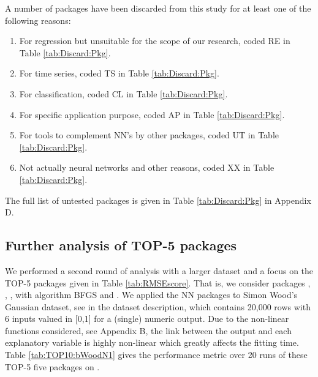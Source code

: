A number of packages have been discarded from this study for at least
one of the following reasons:

\begin{enumerate}
\def\labelenumi{\arabic{enumi}.}
\tightlist
\item
  For regression but unsuitable for the scope of our research, coded RE
  in Table \ref{tab:Discard:Pkg}.
\item
  For time series, coded TS in Table \ref{tab:Discard:Pkg}.
\item
  For classification, coded CL in Table \ref{tab:Discard:Pkg}.
\item
  For specific application purpose, coded AP in Table
  \ref{tab:Discard:Pkg}.
\item
  For tools to complement NN's by other packages, coded UT in Table
  \ref{tab:Discard:Pkg}.
\item
  Not actually neural networks and other reasons, coded XX in Table
  \ref{tab:Discard:Pkg}.
\end{enumerate}

The full list of untested packages is given in Table
\ref{tab:Discard:Pkg} in Appendix D.

\hypertarget{further-analysis-of-top-5-packages}{%
\subsection{Further analysis of TOP-5
packages}\label{further-analysis-of-top-5-packages}}

We performed a second round of analysis with a larger dataset and a
focus on the TOP-5 packages given in Table \ref{tab:RMSEscore}. That is,
we consider packages , , ,
 with algorithm BFGS and . We applied the
NN packages to Simon Wood's Gaussian dataset, see  in the
dataset description, which contains 20,000 rows with 6 inputs valued in
{[}0,1{]} for a (single) numeric output. Due to the non-linear functions
considered, see Appendix B, the link between the output and each
explanatory variable is highly non-linear which greatly affects the
fitting time. Table \ref{tab:TOP10:bWoodN1} gives the performance metric
over 20 runs of these TOP-5 five packages on .

